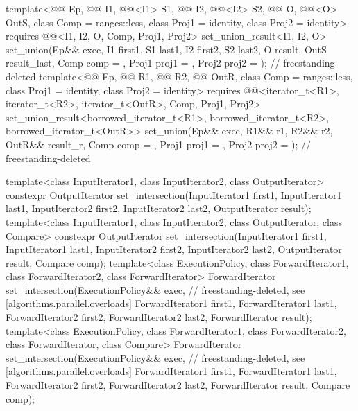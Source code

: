 \begin{codeblock}
{{    template<@@ Ep, @@ I1, @@<I1> S1,
             @@ I2, @@<I2> S2,
             @@ O, @@<O> OutS, class Comp = ranges::less,
             class Proj1 = identity, class Proj2 = identity>
      requires @@<I1, I2, O, Comp, Proj1, Proj2>
      set_union_result<I1, I2, O>
        set_union(Ep&& exec, I1 first1, S1 last1,
                  I2 first2, S2 last2, O result, OutS result_last,
                  Comp comp = {}, Proj1 proj1 = {}, Proj2 proj2 = {});      // freestanding-deleted
    template<@@ Ep, @@ R1, @@ R2,
             @@ OutR, class Comp = ranges::less,
             class Proj1 = identity, class Proj2 = identity>
      requires @@<iterator_t<R1>, iterator_t<R2>, iterator_t<OutR>, Comp, Proj1, Proj2>
      set_union_result<borrowed_iterator_t<R1>, borrowed_iterator_t<R2>,
                       borrowed_iterator_t<OutR>>
        set_union(Ep&& exec, R1&& r1, R2&& r2, OutR&& result_r, Comp comp = {},
                  Proj1 proj1 = {}, Proj2 proj2 = {});                      // freestanding-deleted
  }

  template<class InputIterator1, class InputIterator2, class OutputIterator>
    constexpr OutputIterator
      set_intersection(InputIterator1 first1, InputIterator1 last1,
                       InputIterator2 first2, InputIterator2 last2,
                       OutputIterator result);
  template<class InputIterator1, class InputIterator2, class OutputIterator, class Compare>
    constexpr OutputIterator
      set_intersection(InputIterator1 first1, InputIterator1 last1,
                       InputIterator2 first2, InputIterator2 last2,
                       OutputIterator result, Compare comp);
  template<class ExecutionPolicy, class ForwardIterator1, class ForwardIterator2,
           class ForwardIterator>
    ForwardIterator
      set_intersection(ExecutionPolicy&& exec,                  // freestanding-deleted, see \ref{algorithms.parallel.overloads}
                       ForwardIterator1 first1, ForwardIterator1 last1,
                       ForwardIterator2 first2, ForwardIterator2 last2,
                       ForwardIterator result);
  template<class ExecutionPolicy, class ForwardIterator1, class ForwardIterator2,
           class ForwardIterator, class Compare>
    ForwardIterator
      set_intersection(ExecutionPolicy&& exec,                  // freestanding-deleted, see \ref{algorithms.parallel.overloads}
                       ForwardIterator1 first1, ForwardIterator1 last1,
                       ForwardIterator2 first2, ForwardIterator2 last2,
                       ForwardIterator result, Compare comp);

}
\end{codeblock}
